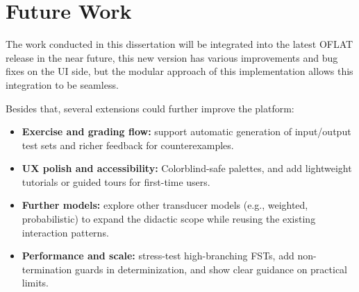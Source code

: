 \section{Future Work}
\label{sec:future_work}

The work conducted in this dissertation will be integrated into the latest OFLAT release in the near future,
this new version has various improvements and bug fixes on the UI side, but the modular approach of this implementation
allows this integration to be seamless.

Besides that, several extensions could further improve the platform:
\begin{itemize}
    \item \textbf{Exercise and grading flow:} support automatic generation of input/output test sets and richer feedback for
        counterexamples.
    \item \textbf{UX polish and accessibility:} Colorblind-safe palettes, and add
        lightweight tutorials or guided tours for first-time users.
    \item \textbf{Further models:} explore other transducer models (e.g., weighted, probabilistic) to expand the didactic scope while reusing
        the existing interaction patterns.
    \item \textbf{Performance and scale:} stress-test high-branching FSTs, add non-termination guards in determinization, 
	and show clear guidance on practical limits.
\end{itemize}
